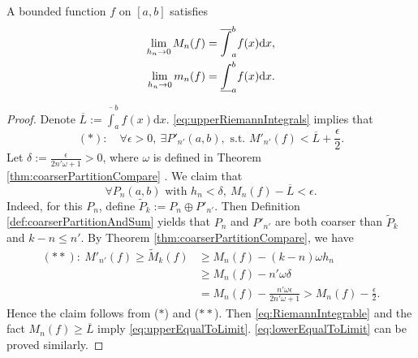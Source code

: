 \begin{thm}[Darboux]
  \label{thm:DarbouxUpperLowerToLimit}
  A bounded function $f$ on $[a,b]$ satisfies
  \begin{align}
    \label{eq:upperEqualToLimit}
    \lim_{h_{n}\rightarrow 0}M_{n}(f)=\overline{\int}_a^b f(x) \mathrm{d} x,\\
    \label{eq:lowerEqualToLimit}
    \lim_{h_{n}\rightarrow 0}m_{n}(f)=\underline{\int}_a^b f(x) \mathrm{d} x.
  \end{align}
\end{thm}
\begin{proof}
  Denote $\overline{L}:=\overline{\int}_{a}^{b}f(x)\mathrm{d}x$.
  \eqref{eq:upperRiemannIntegrals} implies that
  \begin{displaymath}
    (*):\quad
    \forall \epsilon>0,\ \exists P'_{n'}(a,b),\text{ s.t. }
    M'_{n'}(f)<\overline{L}+\frac{\epsilon}{2}. 
  \end{displaymath}
  Let $\delta:=\frac{\epsilon}{2n'\omega+1}>0$,
  where $\omega$ is defined in Theorem \ref{thm:coarserPartitionCompare} .
  We claim that
  \begin{displaymath}
    \forall P_{n}(a,b)\text{ with }h_{n}<\delta,\
    M_{n}(f)-\overline{L}<\epsilon.
  \end{displaymath}
  Indeed, for this $P_{n}$, define
  $\widetilde{P}_{k}:=P_{n}\oplus P'_{n'}$.
  Then Definition \ref{def:coarserPartitionAndSum} yields that
  $P_{n}$ and $P'_{n'}$ are both coarser than $\widetilde{P}_{k}$ and
  $k-n\le n'$. By Theorem \ref{thm:coarserPartitionCompare}, we have
  \begin{align*}
    (**):\
    M'_{n'}(f)\ge
    \widetilde{M}_{k}(f)
    &\ge M_{n}(f)-(k-n)\omega h_{n}\\
    &\ge M_{n}(f)-n'\omega \delta\\
    &= M_{n}(f)-\frac{n'\omega\epsilon}{2n'\omega+1}
      >M_{n}(f)-\frac{\epsilon}{2}.
  \end{align*}
  Hence the claim follows from ($*$) and ($**$).
  Then \eqref{eq:RiemannIntegrable} and
  the fact $M_{n}(f)\ge \overline{L}$ imply
  \eqref{eq:upperEqualToLimit}. \eqref{eq:lowerEqualToLimit}
  can be proved similarly.
\end{proof}

